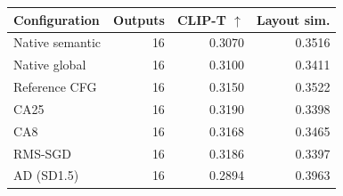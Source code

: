 \begin{tabular}{lrrr}
\toprule
Configuration & Outputs & CLIP-T $\uparrow$ & Layout sim. \\
\midrule
Native semantic & 16 & 0.3070 & 0.3516 \\
Native global & 16 & 0.3100 & 0.3411 \\
Reference CFG & 16 & 0.3150 & 0.3522 \\
CA25 & 16 & 0.3190 & 0.3398 \\
CA8 & 16 & 0.3168 & 0.3465 \\
RMS-SGD & 16 & 0.3186 & 0.3397 \\
AD (SD1.5) & 16 & 0.2894 & 0.3963 \\
\bottomrule
\end{tabular}
